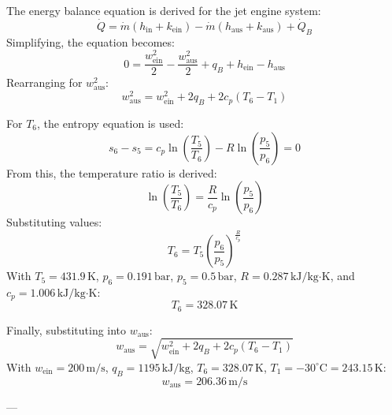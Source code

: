 The energy balance equation is derived for the jet engine system:  
\[
\dot{Q} = \dot{m} \left( h_{\text{in}} + k_{\text{ein}} \right) - \dot{m} \left( h_{\text{aus}} + k_{\text{aus}} \right) + \dot{Q}_B
\]  
Simplifying, the equation becomes:  
\[
0 = \frac{w_{\text{ein}}^2}{2} - \frac{w_{\text{aus}}^2}{2} + q_B + h_{\text{ein}} - h_{\text{aus}}
\]  
Rearranging for \( w_{\text{aus}}^2 \):  
\[
w_{\text{aus}}^2 = w_{\text{ein}}^2 + 2q_B + 2c_p \left( T_6 - T_1 \right)
\]  

For \( T_6 \), the entropy equation is used:  
\[
s_6 - s_5 = c_p \ln \left( \frac{T_5}{T_6} \right) - R \ln \left( \frac{p_5}{p_6} \right) = 0
\]  
From this, the temperature ratio is derived:  
\[
\ln \left( \frac{T_5}{T_6} \right) = \frac{R}{c_p} \ln \left( \frac{p_5}{p_6} \right)
\]  
Substituting values:  
\[
T_6 = T_5 \left( \frac{p_6}{p_5} \right)^{\frac{R}{c_p}}
\]  
With \( T_5 = 431.9 \, \text{K} \), \( p_6 = 0.191 \, \text{bar} \), \( p_5 = 0.5 \, \text{bar} \), \( R = 0.287 \, \text{kJ/kg·K} \), and \( c_p = 1.006 \, \text{kJ/kg·K} \):  
\[
T_6 = 328.07 \, \text{K}
\]  

Finally, substituting into \( w_{\text{aus}} \):  
\[
w_{\text{aus}} = \sqrt{w_{\text{ein}}^2 + 2q_B + 2c_p \left( T_6 - T_1 \right)}
\]  
With \( w_{\text{ein}} = 200 \, \text{m/s} \), \( q_B = 1195 \, \text{kJ/kg} \), \( T_6 = 328.07 \, \text{K} \), \( T_1 = -30^\circ\text{C} = 243.15 \, \text{K} \):  
\[
w_{\text{aus}} = 206.36 \, \text{m/s}
\]

---